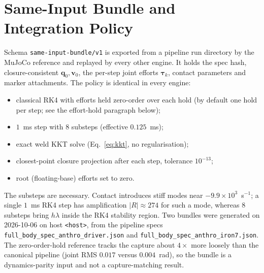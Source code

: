 \documentclass[11pt,a4paper]{article}
\newcommand{\bq}{\mathbf{q}}
\newcommand{\bv}{\mathbf{v}}
\newcommand{\bt}{\boldsymbol{\tau}}
\begin{document}
\section{Same-Input Bundle and Integration Policy}\label{sec:bundle}
Schema \texttt{same-input-bundle/v1} is exported from a pipeline run
directory by the MuJoCo reference and replayed by every other engine.  It holds
the spec hash, closure-consistent $\bq_0,\bv_0$, the per-step joint efforts
$\bt_k$, contact parameters and marker attachments.  The policy is identical in
every engine:
\begin{itemize}[nosep]
\item classical RK4 with efforts held zero-order over each hold (by default one
  hold per step; see the effort-hold paragraph below);
\item $1$~ms step with $8$ substeps (effective $0.125$~ms);
\item exact weld KKT solve (Eq.~\eqref{eq:kkt}, no regularisation);
\item closest-point closure projection after each step, tolerance
  $10^{-13}$;
\item root (floating-base) efforts set to zero.
\end{itemize}
The substeps are necessary.  Contact introduces stiff modes near
$-9.9\times10^{3}$~s$^{-1}$; a single $1$~ms RK4 step has amplification
$|R|\approx274$ for such a mode, whereas $8$ substeps bring $h\lambda$ inside
the RK4 stability region.  Two bundles were generated on 2026-10-06 on host
\texttt{<host>}, from the pipeline specs
\texttt{full\_body\_spec\_anthro\_driver.json} and
\texttt{full\_body\_spec\_anthro\_iron7.json}.  The zero-order-hold reference
tracks the capture about $4\times$ more loosely than the canonical pipeline
(joint RMS $0.017$ versus $0.004$~rad), so the bundle is a dynamics-parity
input and not a capture-matching result.
\end{document}

